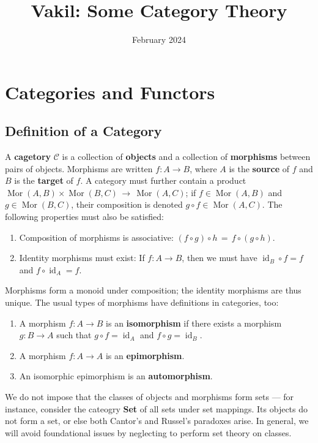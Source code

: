 \documentclass[11pt]{article}
\title{Vakil: Some Category Theory}
\author{February 2024}
\newcommand{\Mor}{\operatorname{Mor}}
\newcommand{\id}{\operatorname{id}}
\newcommand{\C}{\mathscr{C}}
\begin{document}
\maketitle
\tableofcontents
\newpage


\section{Categories and Functors}


\subsection{Definition of a Category}

A \textbf{cagetory} $\C$ is a collection of \textbf{objects} and a collection of \textbf{morphisms} between pairs of objects. Morphisms are written $f : A \to B$, where $A$ is the \textbf{source} of $f$ and $B$ is the \textbf{target} of $f$. A category must further contain a product $\Mor(A, B) \times \Mor(B, C) \, \to \, \Mor(A, C)$; if $f \in \Mor(A, B)$ and $g \in \Mor(B, C)$, their composition is denoted $g \circ f \in \Mor(A, C)$. The following properties must also be satisfied:
\begin{enumerate}
  \item Composition of morphisms is associative: $(f \circ g) \circ h \, = \, f \circ (g \circ h)$.
  \item Identity morphisms must exist: If $f : A \to B$, then we must have $\id_{B} \circ f = f$ and $f \circ \id_{A} = f$.
\end{enumerate}
Morphisms form a monoid under composition; the identity morphisms are thus unique. The usual types of morphisms have definitions in categories, too:
\begin{enumerate}
  \item A morphism $f : A \to B$ is an \textbf{isomorphism} if there exists a morphism $g : B \to A$ such that $g \circ f = \id_{A}$ and $f \circ g = \id_{B}$.
  \item A morphism $f : A \to A$ is an \textbf{epimorphism}.
  \item An isomorphic epimorphism is an \textbf{automorphism}.
\end{enumerate}

We do not impose that the classes of objects and morphisms form sets --- for instance, consider the cateogry \textbf{Set} of all sets under set mappings. Its objects do not form a set, or else both Cantor's and Russel's paradoxes arise. In general, we will avoid foundational issues by neglecting to perform set theory on classes.
\end{document}
